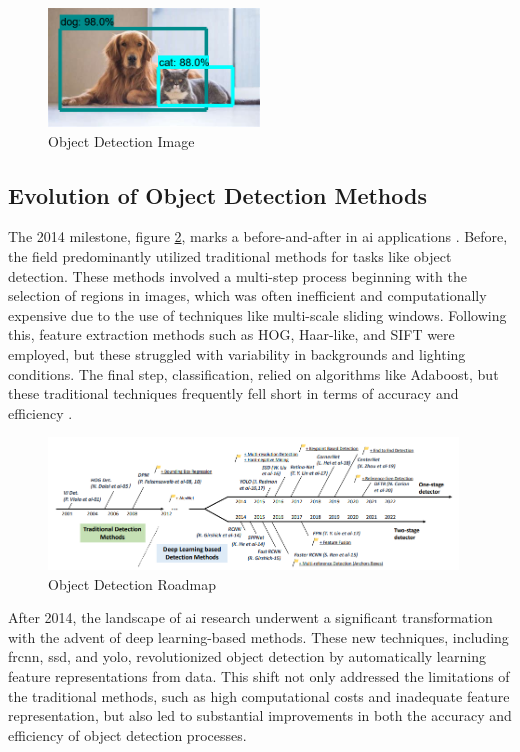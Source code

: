 \begin{figure}[h]
    \centering 
    \includegraphics[width=0.5\textwidth]{figs/object-detection.png} 
    \caption{Object Detection Image~\cite{rfc15}}
    \label{fig:object-detection}
\end{figure}

\subsection{Evolution of Object Detection Methods}

The 2014 milestone, figure \ref{fig:stage-detectors}, marks a before-and-after in \ac{ai} applications \cite{rfc22}. Before, the field predominantly utilized traditional methods for tasks like object detection. These methods involved a multi-step process beginning with the selection of regions in images, which was often inefficient and computationally expensive due to the use of techniques like multi-scale sliding windows. Following this, feature extraction methods such as HOG, Haar-like, and SIFT were employed, but these struggled with variability in backgrounds and lighting conditions. The final step, classification, relied on algorithms like Adaboost, but these traditional techniques frequently fell short in terms of accuracy and efficiency \cite{rfc9}.

\begin{figure}[h]
    \centering 
    \includegraphics[width=0.97\textwidth]{figs/roadmap-stage.png} 
    \caption{Object Detection Roadmap~\cite{rfc22}}
    \label{fig:stage-detectors}
\end{figure}

After 2014, the landscape of \ac{ai} research underwent a significant transformation with the advent of deep learning-based methods. These new techniques, including \ac{frcnn}, \ac{ssd}, and \ac{yolo}, revolutionized object detection by automatically learning feature representations from data. This shift not only addressed the limitations of the traditional methods, such as high computational costs and inadequate feature representation, but also led to substantial improvements in both the accuracy and efficiency of object detection processes.

